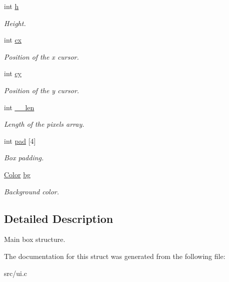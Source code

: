 \begin{DoxyCompactItemize}
$$int \hyperlink{struct__Ui__box_ab81930762400818df39bd6acc348d26f}{h}
\begin{DoxyCompactList}\small\item\em Height. \end{DoxyCompactList}\item 
\mbox{\label{struct__Ui__box_aa44d253872cfb9297e3fa71b93d9fc88}} 
int \hyperlink{struct__Ui__box_aa44d253872cfb9297e3fa71b93d9fc88}{cx}
\begin{DoxyCompactList}\small\item\em Position of the x cursor. \end{DoxyCompactList}\item 
\mbox{\label{struct__Ui__box_a993ecc3e3509632642cb403b731d9a6d}} 
int \hyperlink{struct__Ui__box_a993ecc3e3509632642cb403b731d9a6d}{cy}
\begin{DoxyCompactList}\small\item\em Position of the y cursor. \end{DoxyCompactList}\item 
\mbox{\label{struct__Ui__box_ade30a16b2e23d494a77767ce516f00d9}} 
int \hyperlink{struct__Ui__box_ade30a16b2e23d494a77767ce516f00d9}{\+\_\+\+\_\+len}
\begin{DoxyCompactList}\small\item\em Length of the pixels array. \end{DoxyCompactList}\item 
\mbox{\label{struct__Ui__box_a4030a2fd2487e5a4cde2b4fccc999166}} 
int \hyperlink{struct__Ui__box_a4030a2fd2487e5a4cde2b4fccc999166}{pad} \mbox{[}4\mbox{]}
\begin{DoxyCompactList}\small\item\em Box padding. \end{DoxyCompactList}\item 
\mbox{\label{struct__Ui__box_a2562527c18b6318ba537faae8dd2d06c}} 
\hyperlink{ui_8h_ab87bacfdad76e61b9412d7124be44c1c}{Color} \hyperlink{struct__Ui__box_a2562527c18b6318ba537faae8dd2d06c}{bg}
\begin{DoxyCompactList}\small\item\em Background color. \end{DoxyCompactList}\end{DoxyCompactItemize}


\subsection{Detailed Description}
Main box structure. 

The documentation for this struct was generated from the following file\+:\begin{DoxyCompactItemize}
\item 
src/ui.\+c\end{DoxyCompactItemize}
